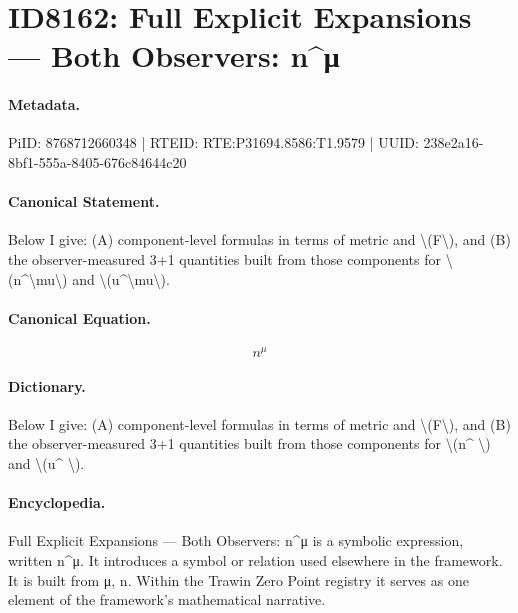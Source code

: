 \section*{ID8162: Full Explicit Expansions — Both Observers: n\textasciicircum{}μ}
\paragraph{Metadata.}
PiID: 8768712660348 | RTEID: RTE:P31694.8586:T1.9579 | UUID: 238e2a16-8bf1-555a-8405-676c84644c20

\paragraph{Canonical Statement.}
Below I give: (A) component-level formulas in terms of metric and \textbackslash{}(F\textbackslash{}), and (B) the observer-measured 3+1 quantities built from those components for \textbackslash{}(n\textasciicircum{}\textbackslash{}mu\textbackslash{}) and \textbackslash{}(u\textasciicircum{}\textbackslash{}mu\textbackslash{}).

\paragraph{Canonical Equation.}
\[
n^\mu
\]

\paragraph{Dictionary.}
Below I give: (A) component-level formulas in terms of metric and \textbackslash{}(F\textbackslash{}), and (B) the observer-measured 3+1 quantities built from those components for \textbackslash{}(n\textasciicircum{} \textbackslash{}) and \textbackslash{}(u\textasciicircum{} \textbackslash{}).

\paragraph{Encyclopedia.}
Full Explicit Expansions — Both Observers: n\textasciicircum{}μ is a symbolic expression, written n\textasciicircum{}μ. It introduces a symbol or relation used elsewhere in the framework. It is built from μ, n. Within the Trawin Zero Point registry it serves as one element of the framework's mathematical narrative.
